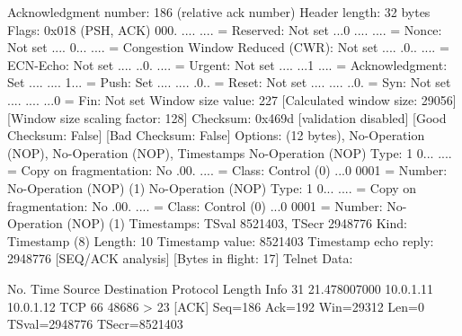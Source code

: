     Acknowledgment number: 186    (relative ack number)
    Header length: 32 bytes
    Flags: 0x018 (PSH, ACK)
        000. .... .... = Reserved: Not set
        ...0 .... .... = Nonce: Not set
        .... 0... .... = Congestion Window Reduced (CWR): Not set
        .... .0.. .... = ECN-Echo: Not set
        .... ..0. .... = Urgent: Not set
        .... ...1 .... = Acknowledgment: Set
        .... .... 1... = Push: Set
        .... .... .0.. = Reset: Not set
        .... .... ..0. = Syn: Not set
        .... .... ...0 = Fin: Not set
    Window size value: 227
    [Calculated window size: 29056]
    [Window size scaling factor: 128]
    Checksum: 0x469d [validation disabled]
        [Good Checksum: False]
        [Bad Checksum: False]
    Options: (12 bytes), No-Operation (NOP), No-Operation (NOP), Timestamps
        No-Operation (NOP)
            Type: 1
                0... .... = Copy on fragmentation: No
                .00. .... = Class: Control (0)
                ...0 0001 = Number: No-Operation (NOP) (1)
        No-Operation (NOP)
            Type: 1
                0... .... = Copy on fragmentation: No
                .00. .... = Class: Control (0)
                ...0 0001 = Number: No-Operation (NOP) (1)
        Timestamps: TSval 8521403, TSecr 2948776
            Kind: Timestamp (8)
            Length: 10
            Timestamp value: 8521403
            Timestamp echo reply: 2948776
    [SEQ/ACK analysis]
        [Bytes in flight: 17]
Telnet
    Data: 

No.     Time           Source                Destination           Protocol Length Info
     31 21.478007000   10.0.1.11             10.0.1.12             TCP      66     48686 > 23 [ACK] Seq=186 Ack=192 Win=29312 Len=0 TSval=2948776 TSecr=8521403

